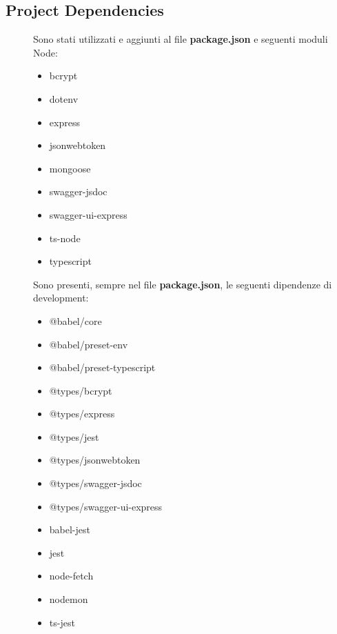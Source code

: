 \documentclass{article}
\begin{document}
\subsection{Project Dependencies}
\begin{description}
    \item[] Sono stati utilizzati e aggiunti al file \textbf{package.json} e seguenti moduli Node:
        \begin{itemize}
            \item bcrypt
            \item dotenv
            \item express
            \item jsonwebtoken
            \item mongoose
            \item swagger-jsdoc
            \item swagger-ui-express
            \item ts-node
            \item typescript
        \end{itemize}
    \item[] Sono presenti, sempre nel file \textbf{package.json}, le seguenti dipendenze di development:
        \begin{itemize}
            \item @babel/core
            \item @babel/preset-env
            \item @babel/preset-typescript
            \item @types/bcrypt
            \item @types/express
            \item @types/jest
            \item @types/jsonwebtoken
            \item @types/swagger-jsdoc
            \item @types/swagger-ui-express
            \item babel-jest
            \item jest
            \item node-fetch
            \item nodemon
            \item ts-jest
        \end{itemize}
\end{description}
\clearpage
\end{document}
